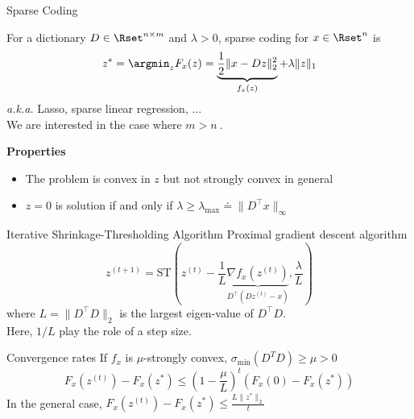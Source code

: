 \documentclass{beamer}
\begin{document}
\begin{frame}{Sparse Coding}

    For a dictionary $D \in \Rset^{n\times m}$ and $\lambda > 0$, sparse coding for $x\in \Rset^n$ is \\[.5em]
    \[
    z^{*} = \argmin_{z} F_x(z) = 
    \underbrace{\frac{1}{2}\| x - D z\|_2^2}_{f_x(z)}
    + \lambda\| z\|_1
    \]
    \emph{a.k.a.} Lasso, sparse linear regression, ...\\[1em]
    We are interested in the case where $m > n~.$\\[2em]
    {\centering
    \setlength{}
    \begin{block}{\bf Properties}
        \begin{itemize}\color{black}\itemsep.5em
            \item The problem is convex in $z$ but not strongly convex in general
            \item $z=0$ is solution if and only if
                $\lambda \ge \lambda_{\max} \doteq \|D^\top x\|_\infty$
        \end{itemize}
    \end{block}}
\end{frame}

\begin{frame}{Iterative Shrinkage-Thresholding Algorithm }
    Proximal gradient descent algorithm
    \[
        z^{(t+1)} = \text{ST}\left(z^{(t)}
                                   - \frac{1}{L}\underbrace{\nabla f_x(z^{(t)})}_{D^\top(D z^{(t)} - x)},
                                   \frac{\lambda}{L}\right)
    \]
    where $L = \|D^\top D\|_2$ is the largest eigen-value of $D^\top D$.\\
    Here, $1/L$ play the role of a step size.
    \begin{block}{Convergence rates}
       If $f_x$ is $\mu$-strongly convex, \ie{} $\sigma_{\min}(D^TD) \ge \mu > 0$
       \[
            F_x(z^{(t)}) - F_x(z^*) \le \left(1 - \frac{\mu}{L}\right)^t\left(F_x(0) - F_x(z^*)\right)
       \]
       In the general case, $F_x(z^{(t)}) - F_x(z^*) \le \frac{L\|z^*\|_2}{t}$\\
     \end{block}
\end{frame}
\end{document}
